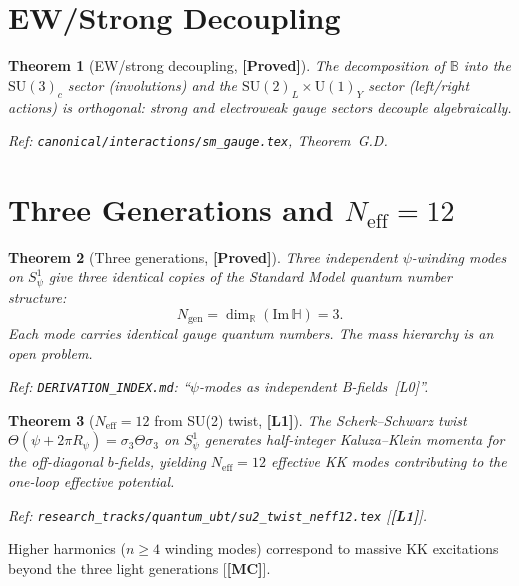 \documentclass[12pt,a4paper]{article}
\newtheorem{theorem}{Theorem}[section]
\theoremstyle{definition}
\theoremstyle{remark}
\newcommand{\PROVED}{\textbf{[Proved]}}
\newcommand{\SU}[1]{\mathrm{SU}(#1)}
\newcommand{\UU}[1]{\mathrm{U}(#1)}
\newcommand{\Lone}{\textbf{[L1]}}
\newcommand{\MC}{\textbf{[MC]}}
\begin{document}
\section{EW/Strong Decoupling}
\label{sec:decoupling}

\begin{theorem}[EW/strong decoupling, \PROVED]
\label{thm:decoupling}
The decomposition of $\mathbb{B}$ into the $\SU{3}_c$ sector (involutions)
and the $\SU{2}_L\times\UU{1}_Y$ sector (left/right actions) is orthogonal:
strong and electroweak gauge sectors decouple algebraically.

Ref: \texttt{canonical/interactions/sm\_gauge.tex}, Theorem~G.D.
\end{theorem}

\section{Three Generations and $N_{\mathrm{eff}}=12$}
\label{sec:generations}
\label{sec:neff}

\begin{theorem}[Three generations, \PROVED]
\label{thm:generations}
Three independent $\psi$-winding modes on $S^1_\psi$ give three
identical copies of the Standard Model quantum number structure:
\[
  N_{\mathrm{gen}} = \dim_\mathbb{R}(\mathrm{Im}\,\mathbb{H}) = 3.
\]
Each mode carries identical gauge quantum numbers.
The mass hierarchy is an open problem.

Ref: \texttt{DERIVATION\_INDEX.md}: ``$\psi$-modes as independent B-fields~[L0]''.
\end{theorem}

\begin{theorem}[$N_{\mathrm{eff}}=12$ from SU(2) twist, \Lone]
\label{thm:neff}
The Scherk--Schwarz twist $\Theta(\psi + 2\pi R_\psi) = \sigma_3\Theta\sigma_3$
on $S^1_\psi$ generates half-integer Kaluza--Klein momenta for the
off-diagonal $b$-fields, yielding $N_{\mathrm{eff}} = 12$ effective KK modes
contributing to the one-loop effective potential.

Ref: \texttt{research\_tracks/quantum\_ubt/su2\_twist\_neff12.tex} [\Lone].
\end{theorem}

Higher harmonics ($n\geq 4$ winding modes) correspond to massive KK excitations
beyond the three light generations [\MC].
\end{document}
